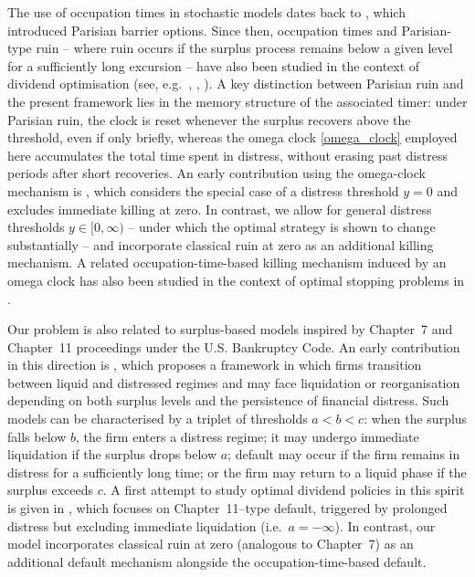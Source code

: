 \documentclass[11pt]{article} %
\numberwithin{komcounter}{section}
\numberwithin{equation}{section}
\numberwithin{theorem}{section}
\begin{document}
The use of occupation times in stochastic models dates back to \cite{chesney1997brownian}, which introduced Parisian barrier options. 
Since then, occupation times and Parisian-type ruin -- where ruin occurs if the surplus process remains below a given level for a sufficiently long excursion -- have also been studied in the context of dividend optimisation (see, e.g.~\cite{czarna2014dividend}, \cite{xu2022optimal}, \cite{wang2024optimality}). 
A key distinction between Parisian ruin and the present framework lies in the memory structure of the associated timer: 
under Parisian ruin, the clock is reset whenever the surplus recovers above the threshold, even if only briefly, whereas the omega clock \eqref{omega_clock} employed here accumulates the total time spent in distress, without erasing past distress periods after short recoveries. 
An early contribution using the omega-clock mechanism is \cite{albrecher2011optimal}, which considers the special case of a distress threshold $y=0$ and excludes immediate killing at zero. 
In contrast, we allow for general distress thresholds $y\in[0,\infty)$ -- under which the optimal strategy is shown to change substantially -- and incorporate classical ruin at zero as an additional killing mechanism. 
A related occupation-time-based killing mechanism induced by an omega clock has also been studied in the context of optimal stopping problems in \cite{neo_omega2018}.


Our problem is also related to surplus-based models inspired by Chapter~7 and Chapter~11 proceedings under the U.S. Bankruptcy Code. 
An early contribution in this direction is \cite{Chapter11_early}, which proposes a framework in which firms transition between liquid and distressed regimes and may face liquidation or reorganisation depending on both surplus levels and the persistence of financial distress. 
Such models can be characterised by a triplet of thresholds $a<b<c$: 
when the surplus falls below $b$, the firm enters a distress regime; it may undergo immediate liquidation if the surplus drops below $a$; default may occur if the firm remains in distress for a sufficiently long time; or the firm may return to a liquid phase if the surplus exceeds $c$. 
A first attempt to study optimal dividend policies in this spirit is given in \cite{wang2024optimality}, which focuses on Chapter~11–type default, triggered by prolonged distress but excluding immediate liquidation (i.e.~$a=-\infty$). 
In contrast, our model incorporates classical ruin at zero (analogous to Chapter~7) as an additional default mechanism alongside the occupation-time-based default.
\end{document}
